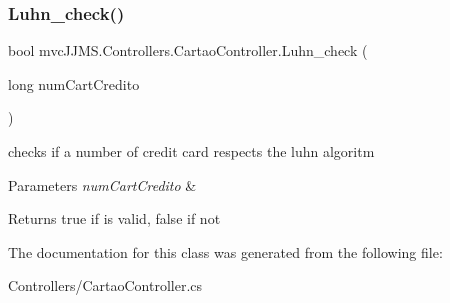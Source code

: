 \subsubsection{\texorpdfstring{Luhn\+\_\+check()}{Luhn\_check()}}
{\footnotesize\ttfamily bool mvc\+J\+J\+M\+S.\+Controllers.\+Cartao\+Controller.\+Luhn\+\_\+check (\begin{DoxyParamCaption}\item[{long}]{num\+Cart\+Credito }\end{DoxyParamCaption})\hspace{0.3cm}{\ttfamily [inline]}}



checks if a number of credit card respects the luhn algoritm 


\begin{DoxyParams}{Parameters}
{\em num\+Cart\+Credito} & \\
\hline
\end{DoxyParams}
\begin{DoxyReturn}{Returns}
true if is valid, false if not
\end{DoxyReturn}


The documentation for this class was generated from the following file\+:\begin{DoxyCompactItemize}
\item 
Controllers/Cartao\+Controller.\+cs\end{DoxyCompactItemize}
